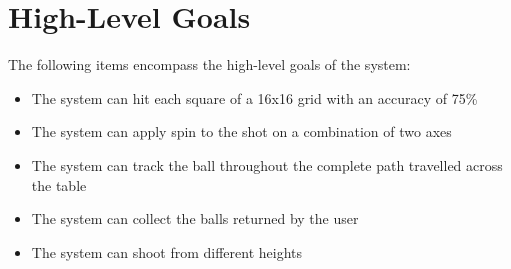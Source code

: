 \documentclass[11pt]{article}
\begin{document}
\section{High-Level Goals}
The following items encompass the high-level goals of the system:
\begin{itemize}
\item The system can hit each square of a 16x16 grid with an accuracy of 75\%
\item The system can apply spin to the shot on a combination of two axes
\item The system can track the ball throughout the complete path travelled across the table
\item The system can collect the balls returned by the user
\item The system can shoot from different heights
\end{itemize}
\end{document}

